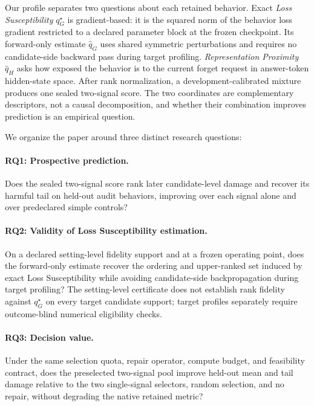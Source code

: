Our profile separates two questions about each retained behavior. Exact
\emph{Loss Susceptibility} $q_G^\star$ is gradient-based: it is the squared
norm of the behavior loss gradient restricted to a declared parameter block at
the frozen checkpoint. Its forward-only estimate $\widehat q_G$ uses shared
symmetric perturbations and requires no candidate-side backward pass during
target profiling.
\emph{Representation Proximity} $\widehat q_H$ asks how exposed the behavior
is to the current forget request in answer-token hidden-state space. After
rank normalization, a development-calibrated mixture produces one sealed
two-signal score. The two coordinates are complementary descriptors, not
a causal decomposition, and whether their combination improves prediction is
an empirical question.

We organize the paper around three distinct research questions:

\paragraph{RQ1: Prospective prediction.}
Does the sealed two-signal score rank later candidate-level damage and recover
its harmful tail on held-out audit behaviors, improving over each signal alone
and over predeclared simple controls?

\paragraph{RQ2: Validity of Loss Susceptibility estimation.}
On a declared setting-level fidelity support and at a frozen operating point,
does the forward-only estimate recover the ordering and upper-ranked set
induced by exact Loss Susceptibility while avoiding candidate-side
backpropagation during target profiling? The setting-level certificate does
not establish rank fidelity against $q_G^\star$ on every target candidate
support; target profiles separately require outcome-blind numerical
eligibility checks.

\paragraph{RQ3: Decision value.}
Under the same selection quota, repair operator, compute budget, and
feasibility contract, does the preselected two-signal pool improve held-out
mean and tail damage relative to the two single-signal selectors, random
selection, and no repair, without degrading the native retained metric?

